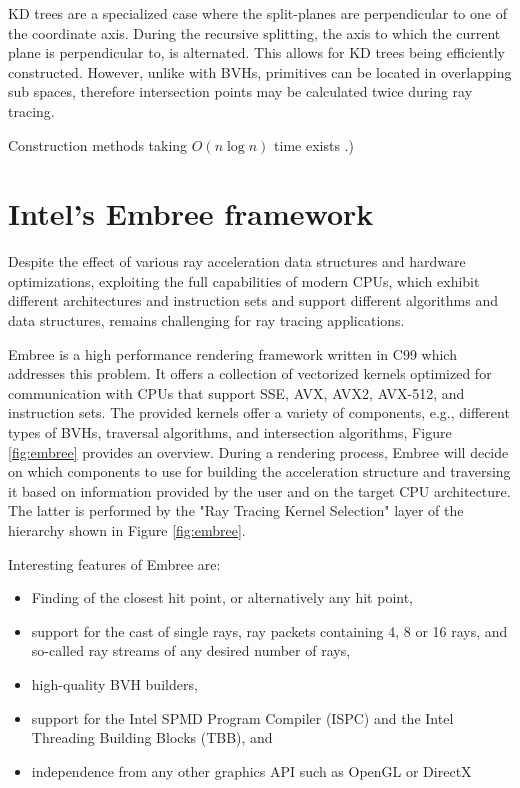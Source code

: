 KD trees are a specialized case where the split-planes are perpendicular to one of the coordinate axis. During the recursive splitting, the axis to which the current plane is perpendicular to, is alternated. This allows for KD trees being efficiently constructed. However,  unlike with BVHs, primitives can be located in overlapping sub spaces, therefore intersection points may be calculated twice during ray tracing. 

Construction methods taking $O(n\log n)$ time exists \cite{wald2001interactive}.) 

\section{Intel's Embree framework}
Despite the effect of various ray acceleration data structures and hardware optimizations, exploiting the full capabilities of modern CPUs, which exhibit different architectures and instruction sets and support different algorithms and data structures, remains challenging for ray tracing applications.

Embree is a high performance rendering framework written in C99 which addresses this problem. It offers a collection of vectorized kernels optimized for communication with CPUs that support SSE, AVX, AVX2, AVX-512, and instruction sets. The provided kernels offer a variety of components, e.g., different types of BVHs, traversal algorithms, and intersection algorithms, Figure \ref{fig:embree} provides an overview.
During a rendering process, Embree will decide on which components to use for building the acceleration structure and traversing it based on information provided by the user and on the target CPU architecture. The latter is performed by the "Ray Tracing Kernel Selection" layer of the hierarchy shown in Figure \ref{fig:embree}.

Interesting features of Embree are:
\begin{itemize}
	\setlength\itemsep{0.05em}
	\item 	Finding of the closest hit point, or alternatively any hit point,
	\item 	support for the cast of single rays, ray packets containing 4, 8 or 16 rays, and so-called ray streams of any desired number of rays,
	\item 	high-quality BVH builders,
	\item 	support for the Intel SPMD Program Compiler (ISPC) and the Intel Threading Building Blocks (TBB), and
	\item 	independence from any other graphics API such as OpenGL or DirectX
\end{itemize}

